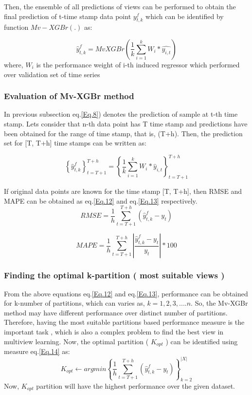 Then, the ensemble of all predictions of views can be performed to obtain the final prediction of t-time stamp data point $y_{t, k}^{f}$ which can be identified by function $Mv-XGBr(.)$ as:

\begin{equation}
\label{Eq.10}
	\hat{y}_{t, k}^{f} = MvXGBr\left ( \frac{1}{k}\sum_{i=1}^{k}W_{i}*\hat{y_{i, t}} \right )
\end{equation}
where, $W_{i}$ is the performance weight of i-th induced regressor which performed over validation set of time series

\subsubsection{Evaluation of Mv-XGBr method}
In previous subsection eq.\ref{Eq.8}) denotes the prediction of sample at t-th time stamp. Lets consider that n-th data point has T time stamp and predictions have been obtained for the range of time stamp, that is, (T+h). Then, the prediction set for [T, T+h] time stamps can be written as:

\begin{equation}
\label{Eq.11}
    \left \{ \hat{y}_{t, k}^{f} \right \}_{t=T+1}^{T+h} =    \left \{ \frac{1}{k} \sum_{i=1}^{k} W_{i}*\hat{y}_{i, t} \right \}_{t=T+1}^{T+h}   
\end{equation}

If original data points are known for the time stamp [T, T+h], then RMSE and MAPE can be obtained as eq.\ref{Eq.12} and eq.\ref{Eq.13} respectively.
\begin{equation}
\label{Eq.12}
    RMSE = \frac{1}{h} \sum_{t=T+1}^{T+h}(\hat{y}_{t, k}^{f} - y_{t})
\end{equation}

\begin{equation}
\label{Eq.13}
     MAPE = \frac{1}{h} \sum_{t=T+1}^{T+h}  \left |\frac{{\hat{y}_{t, k}^{f} - y_{t}}{}}{y_{t}}   \right |* 100
\end{equation}


\subsubsection{Finding the optimal k-partition ( most suitable views )}
From the above equations eq.\ref{Eq.12} and eq.\ref{Eq.13}, performance can be obtained for k-number of partitions, which can varies as, $k=1,2,3,....n$. So, the Mv-XGBr method may have different performance over distinct number of partitions. Therefore, having the most suitable partitions based performance measure is the important task , which is also a complex problem to find the best view in multiview learning. Now, the optimal partition ( $K_{opt}$ ) can be identified using measure eq.\ref{Eq.14} as:
\begin{equation}
\label{Eq.14}
    K_{opt}\leftarrow arg min\left \{ \frac{1}{h} \sum_{t=T+1}^{T+h}(\hat{y}_{t, k}^{f} - y_{t}) \right \}_{k=2}^{|X|}
\end{equation}
Now, $K_{opt}$ partition will have the highest performance over the given dataset.

